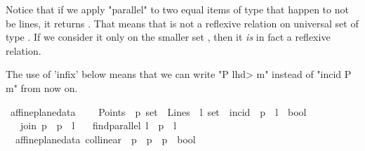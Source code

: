 \begin{isabellebody}
\begin{isamarkuptext}
Notice that if we apply "parallel" to two equal items of type  that happen to not be lines, 
it returns . That means that  is not a reflexive relation on universal set of type 
. If we consider it only on the smaller set , then it \emph{is} in fact a reflexive
relation.%
\end{isamarkuptext}\isamarkuptrue%
%
\begin{isamarkuptext}%
The use of 'infix' below means that we can write "P \<lhd> m" instead of "incid P m" from now on.%
\end{isamarkuptext}\isamarkuptrue%
\isamarkupfalse%
\ affine{\isacharunderscore}{\kern0pt}plane{\isacharunderscore}{\kern0pt}data\ {\isacharequal}{\kern0pt}\isanewline
\ \ \ Points\ {\isacharcolon}{\kern0pt}{\isacharcolon}{\kern0pt}\ {\isachardoublequoteopen}{\isacharprime}{\kern0pt}p\ set{\isachardoublequoteclose}\ \ Lines\ {\isacharcolon}{\kern0pt}{\isacharcolon}{\kern0pt}\ {\isachardoublequoteopen}{\isacharprime}{\kern0pt}l\ set{\isachardoublequoteclose}\ \ incid\ {\isacharcolon}{\kern0pt}{\isacharcolon}{\kern0pt}\ {\isachardoublequoteopen}{\isacharprime}{\kern0pt}p\ {\isasymRightarrow}\ {\isacharprime}{\kern0pt}l\ {\isasymRightarrow}\ bool{\isachardoublequoteclose}\ {\isacharparenleft}{\kern0pt}\ {\isachardoublequoteopen}{\isasymlhd}{\isachardoublequoteclose}\ {}{}{\isacharparenright}{\kern0pt}\isanewline
\ \ \ join{\isacharcolon}{\kern0pt}{\isacharcolon}{\kern0pt}\ {\isachardoublequoteopen}{\isacharprime}{\kern0pt}p\ {\isasymRightarrow}\ {\isacharprime}{\kern0pt}p\ {\isasymRightarrow}\ {\isacharprime}{\kern0pt}l{\isachardoublequoteclose}\isanewline
\ \ \ find{\isacharunderscore}{\kern0pt}parallel{\isacharcolon}{\kern0pt}{\isacharcolon}{\kern0pt}\ {\isachardoublequoteopen}{\isacharprime}{\kern0pt}l\ {\isasymRightarrow}\ {\isacharprime}{\kern0pt}p\ {\isasymRightarrow}\ {\isacharprime}{\kern0pt}l{\isachardoublequoteclose}\isanewline
{}\isanewline
\isanewline
\isanewline
{}\isamarkupfalse%
\ {\isacharparenleft}{\kern0pt}\ affine{\isacharunderscore}{\kern0pt}plane{\isacharunderscore}{\kern0pt}data{\isacharparenright}{\kern0pt}\ collinear\ {\isacharcolon}{\kern0pt}{\isacharcolon}{\kern0pt}\ {\isachardoublequoteopen}{\isacharprime}{\kern0pt}p\ {\isasymRightarrow}\ {\isacharprime}{\kern0pt}p\ {\isasymRightarrow}\ {\isacharprime}{\kern0pt}p\ {\isasymRightarrow}\ bool{\isachardoublequoteclose}\isanewline

\end{isabellebody}
